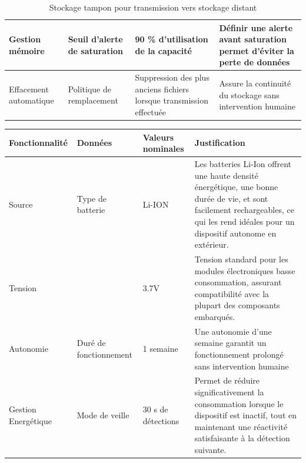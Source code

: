 \begin{table}[ht]
\begin{tabularx}{\textwidth}{|p{3.2cm}|p{2.3cm}|p{3.5cm}|X|}
      \hline
      Gestion mémoire         & Seuil d'alerte de saturation & 90 \% d'utilisation de la capacité                                   & Définir une alerte avant saturation permet d'éviter la perte de données                                                    \\
      \hline
      Effacement automatique  & Politique de remplacement    & Suppression des plus anciens fichiers lorsque transmission effectuée & Assure la continuité du stockage sans intervention humaine                                                                 \\
      \hline
   \end{tabularx}
   \caption{Stockage tampon pour transmission vers stockage distant}
\end{table}


\begin{table}[ht]
   \centering
   \renewcommand{\arraystretch}{0.92} %
   \begin{tabularx}{\textwidth}{|p{3cm}|p{2.3cm}|p{2.2cm}|X|}
      \hline
      \textbf{Fonctionnalité} & \textbf{Données}              & \textbf{Valeurs nominales}           & \textbf{Justification}                                                                                                                                                                  \\
      \hline
      Source                  & Type de batterie              & Li-ION                               & Les batteries Li-Ion offrent une haute densité énergétique, une bonne durée de vie, et sont facilement rechargeables, ce qui les rend idéales pour un dispositif autonome en extérieur. \\
      \hline
      Tension                 &                               & 3.7V                                 & Tension standard pour les modules électroniques basse consommation, assurant compatibilité avec la plupart des composants embarqués.                                                    \\
      \hline
      Autonomie               & Duré de fonctionnement        & 1 semaine                            & Une autonomie d'une semaine garantit un fonctionnement prolongé sans intervention humaine                                                                                               \\
      \hline
      Gestion Energétique     & Mode de veille                & 30 s de détections                   & Permet de réduire significativement la consommation lorsque le dispositif est inactif, tout en maintenant une réactivité satisfaisante à la détection suivante.                         \\

\end{tabularx}
\end{table}
